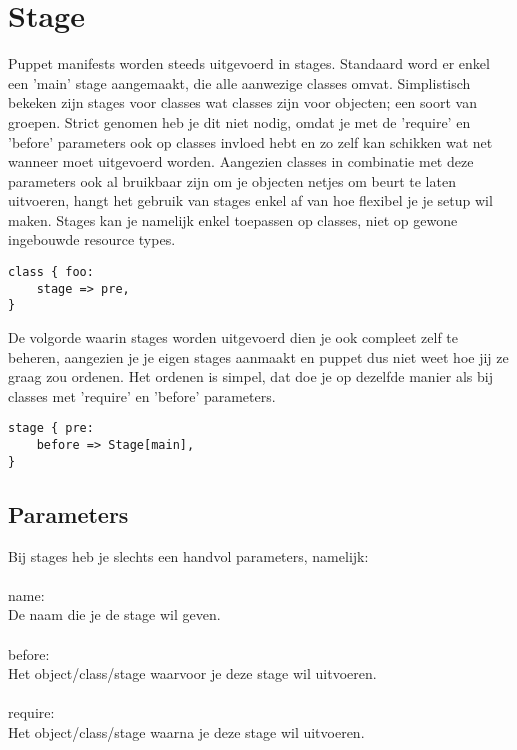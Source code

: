 \section{Stage}
Puppet manifests worden steeds uitgevoerd in stages. Standaard word er enkel een 'main'  stage aangemaakt, die alle aanwezige classes omvat. Simplistisch bekeken zijn stages voor classes wat classes zijn voor objecten; een soort van groepen. Strict genomen heb je dit niet nodig, omdat je met de 'require' en 'before' parameters ook op classes invloed hebt en zo zelf kan schikken wat net wanneer moet uitgevoerd worden. Aangezien classes in combinatie met deze parameters ook al bruikbaar zijn om je objecten netjes om beurt te laten uitvoeren, hangt het gebruik van stages enkel af van hoe flexibel je je setup wil maken. Stages kan je namelijk enkel toepassen op classes, niet op gewone ingebouwde resource types.
%
\begin{code}
\begin{lstlisting}
class { foo:
	stage => pre,
}
\end{lstlisting}
\end{code}
%
De volgorde waarin stages worden uitgevoerd dien je ook compleet zelf te beheren, aangezien je je eigen stages aanmaakt en puppet dus niet weet hoe jij ze graag zou ordenen. Het ordenen is simpel, dat doe je op dezelfde manier als bij classes met 'require' en 'before' parameters.
%
\begin{code}
\begin{lstlisting}
stage { pre:
	before => Stage[main],
}
\end{lstlisting}
\end{code}
%
\subsection{Parameters}
Bij stages heb je slechts een handvol parameters, namelijk:\\\\
name:\\
De naam die je de stage wil geven.\\\\
before:\\
Het object/class/stage waarvoor je deze stage wil uitvoeren.\\\\
require:\\
Het object/class/stage waarna je deze stage wil uitvoeren.\\\\
